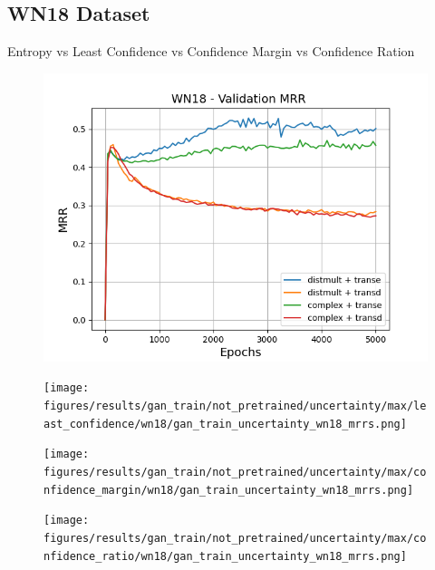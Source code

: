 \subsection{WN18 Dataset}

Entropy 
vs 
Least Confidence 
vs 
Confidence Margin 
vs 
Confidence Ration

\begin{figure}
    \centering
    \begin{minipage}{.5\textwidth}
      \centering
      \includegraphics[width=0.9\linewidth]{figures/results/gan_train/not_pretrained/uncertainty/max/entropy/wn18/gan_train_uncertainty_wn18_mrrs.png}
    \end{minipage}%
    \begin{minipage}{.5\textwidth}
      \centering
      \texttt{[image: figures/results/gan\_train/not\_pretrained/uncertainty/max/least\_confidence/wn18/gan\_train\_uncertainty\_wn18\_mrrs.png]}
    \end{minipage}
    \begin{minipage}{.5\textwidth}
      \centering
      \texttt{[image: figures/results/gan\_train/not\_pretrained/uncertainty/max/confidence\_margin/wn18/gan\_train\_uncertainty\_wn18\_mrrs.png]}
    \end{minipage}%
    \begin{minipage}{.5\textwidth}
      \centering
      \texttt{[image: figures/results/gan\_train/not\_pretrained/uncertainty/max/confidence\_ratio/wn18/gan\_train\_uncertainty\_wn18\_mrrs.png]}
    \end{minipage}%
    \caption{}
    \label{fig:advtrain_metrics_wn18}
\end{figure}

